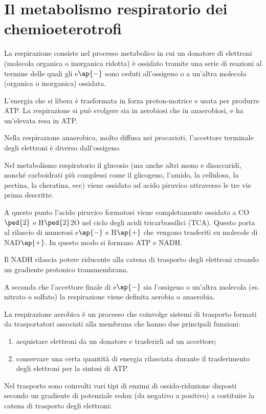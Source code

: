 \documentclass[11pt]{book}
\begin{document}
\section{Il metabolismo respiratorio dei chemioeterotrofi}
La respirazione consiste nel processo metabolico in cui un donatore di elettroni (molecola organica o inorganica ridotta) è ossidato tramite una serie di reazioni al termine delle quali gli e$\ap{-}$ sono ceduti all’ossigeno o a un’altra molecola (organica o inorganica) ossidata.

L’energia che si libera è trasformata in forza proton-motrice e usata per produrre ATP. 
La respirazione si può svolgere sia in aerobiosi che in anaerobiosi, e ha un’elevata resa in ATP.

Nella respirazione anaerobica, molto diffusa nei procarioti, l’accettore terminale degli elettroni è diverso dall’ossigeno.

Nel metabolismo respiratorio il glucosio (ma anche altri mono e disaccaridi, nonché carboidrati più complessi come il glicogeno, l'amido, la cellulosa, la pectina, la cheratina, ecc) viene ossidato ad acido piruvico attraverso le tre vie prima descritte.

A questo punto l’acido piruvico formatosi viene completamente ossidato a CO$\ped{2}$ e H$\ped{2}$2O nel ciclo degli acidi tricarbossilici (TCA). Questo porta al rilascio di numerosi e$\ap{-}$ e H$\ap{+}$ che vengono trasferiti su molecole di NAD$\ap{+}$.
In questo modo si formano ATP e NADH.

Il NADH rilascia potere riducente alla catena di trasporto degli elettroni creando un gradiente protonico transmembrana. 

A seconda che l’accettore finale di e$\ap{-}$ sia l’ossigeno o un’altra molecola (es. nitrato o solfato) la respirazione viene definita aerobia o anaerobia.

\vspace{1em}
La respirazione aerobica è un processo che coinvolge sistemi di trasporto formati da trasportatori associati alla membrana che hanno due principali funzioni:
\begin{enumerate} 
\item acquistare elettroni da un donatore e trasferirli ad un accettore;
\item conservare una certa quantità di energia rilasciata durante il trasferimento degli elettroni per la sintesi di ATP.
\end{enumerate}

Nel trasporto sono coinvolti vari tipi di enzimi di ossido-riduzione disposti secondo un gradiente di potenziale redox (da negativo a positivo) a costituire la catena di trasporto degli elettroni:
\end{document}
